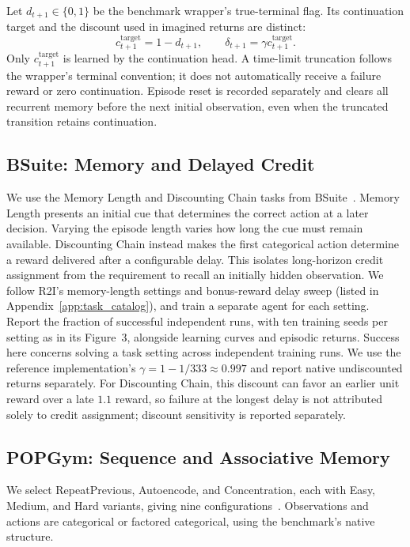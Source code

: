 \documentclass{article}
\begin{document}
Let $d_{t+1}\in\{0,1\}$ be the benchmark wrapper's true-terminal flag. Its continuation target and the discount used in imagined returns are distinct:
\begin{equation}
c_{t+1}^{\mathrm{target}}=1-d_{t+1},\qquad
\delta_{t+1}=\gamma c_{t+1}^{\mathrm{target}}.
\label{eq:benchmark_discount}
\end{equation}
Only $c_{t+1}^{\mathrm{target}}$ is learned by the continuation head. A time-limit truncation follows the wrapper's terminal convention; it does not automatically receive a failure reward or zero continuation. Episode reset is recorded separately and clears all recurrent memory before the next initial observation, even when the truncated transition retains continuation.

\subsection{BSuite: Memory and Delayed Credit}

We use the Memory Length and Discounting Chain tasks from BSuite~\cite{osband2020bsuite}. Memory Length presents an initial cue that determines the correct action at a later decision. Varying the episode length varies how long the cue must remain available. Discounting Chain instead makes the first categorical action determine a reward delivered after a configurable delay. This isolates long-horizon credit assignment from the requirement to recall an initially hidden observation. We follow R2I's memory-length settings and bonus-reward delay sweep (listed in Appendix~\ref{app:task_catalog}), and train a separate agent for each setting. Report the fraction of successful independent runs, with ten training seeds per setting as in its Figure~3, alongside learning curves and episodic returns. Success here concerns solving a task setting across independent training runs. We use the reference implementation's $\gamma=1-1/333\approx0.997$ and report native undiscounted returns separately. For Discounting Chain, this discount can favor an earlier unit reward over a late $1.1$ reward, so failure at the longest delay is not attributed solely to credit assignment; discount sensitivity is reported separately.

\subsection{POPGym: Sequence and Associative Memory}

We select RepeatPrevious, Autoencode, and Concentration, each with Easy, Medium, and Hard variants, giving nine configurations~\cite{morad2023popgym}. Observations and actions are categorical or factored categorical, using the benchmark's native structure.
\end{document}
